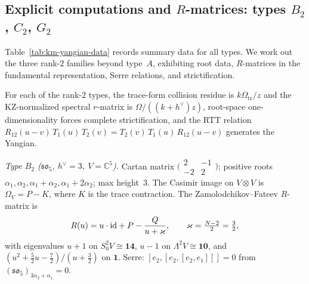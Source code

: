 \subsection{Explicit computations and $R$-matrices: types $B_2$, $C_2$, $G_2$}
\label{subsec:BCG-yangians}

Table~\ref{tab:km-yangian-data} records summary data for all types.
We work out the three rank-$2$ families beyond type~$A$, exhibiting
root data, $R$-matrices in the fundamental representation, Serre
relations, and strictification.

\begin{theorem}
\label{thm:B2-ordered-bar}
\label{thm:C2-ordered-bar}
\label{thm:G2-ordered-bar}
\label{thm:r-so5}
\label{thm:r-sp4}
\label{thm:r-g2}
For each of the rank-$2$ types, the trace-form collision residue is
$k\Omega_{\mathrm{tr}}/z$ and the KZ-normalized spectral $r$-matrix is
$\Omega/((k{+}h^\vee)z)$,
root-space one-dimensionality forces complete strictification, and
the RTT relation
$R_{12}(u{-}v)\,T_1(u)\,T_2(v)
= T_2(v)\,T_1(u)\,R_{12}(u{-}v)$
generates the Yangian.

\emph{Type $B_2$ \textup{(}$\mathfrak{so}_5$, $h^\vee=3$,
$V=\mathbb{C}^5$\textup{)}.}
Cartan matrix
$\bigl(\begin{smallmatrix} 2&-1\\-2&2
\end{smallmatrix}\bigr)$;
positive roots $\alpha_1, \alpha_2,
\alpha_1{+}\alpha_2, \alpha_1{+}2\alpha_2$; max height~$3$.
The Casimir image on $V\otimes V$ is $\Omega_V = P - K$,
where $K$ is the trace contraction.
The Zamolodchikov--Fateev $R$-matrix is
\begin{equation}\label{eq:B2-R-matrix}
R(u) = u\cdot\mathrm{id} + P - \frac{Q}{u+\varkappa},
\qquad \varkappa = \tfrac{N-2}{2} = \tfrac{3}{2},
\end{equation}
with eigenvalues $u{+}1$ on
$S^2_0V\cong\mathbf{14}$, $u{-}1$ on
$\Lambda^2V\cong\mathbf{10}$, and
$(u^2{+}\tfrac{5}{2}u{-}\tfrac{7}{2})/(u{+}\tfrac{3}{2})$ on
$\mathbf{1}$.
Serre: $[e_2,[e_2,[e_2,e_1]]]=0$ from
$(\mathfrak{so}_5)_{3\alpha_2+\alpha_1}=0$.


\end{theorem}
